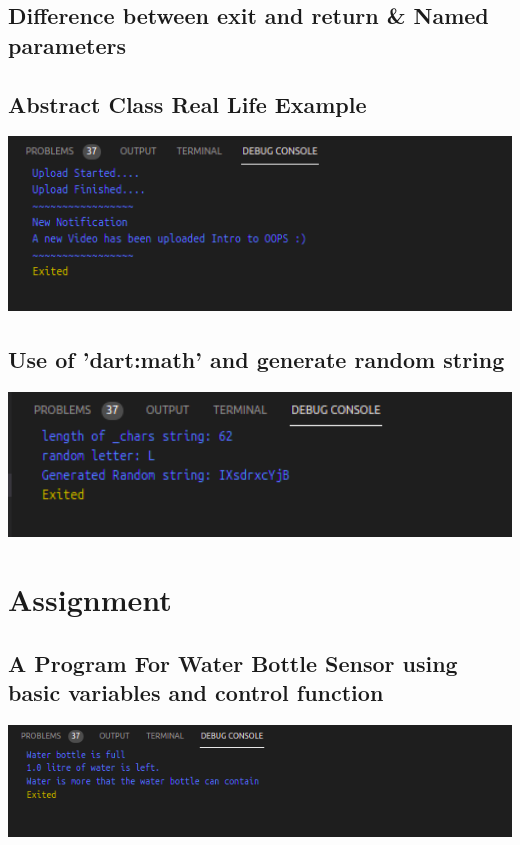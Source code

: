\subsection{Difference between exit and return \& Named parameters}

\subsection{Abstract Class Real Life Example}

\includegraphics[width=16cm]{dart/abstract.png}\\[0.5cm]
\subsection{Use of 'dart:math' and generate random string}

\includegraphics[width=16cm]{dart/randomgeneratestring.png}\\[0.5cm]
\section{Assignment}
\subsection{A Program For Water Bottle Sensor using basic variables and control function}

\includegraphics[width=16cm]{dart/waterbottleOutput.png}\\[0.5cm]

